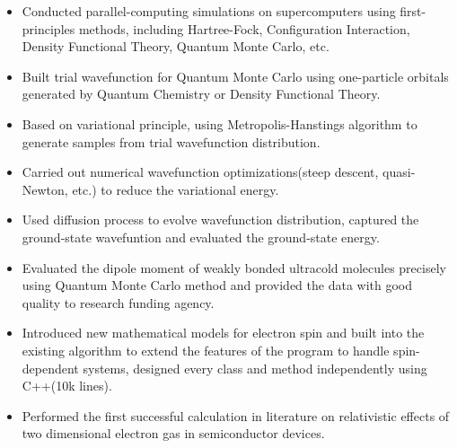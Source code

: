 \documentclass[11pt]{article} %
\begin{document}
\begin{itemize}
\item Conducted parallel-computing simulations on supercomputers using first-principles methods, including Hartree-Fock, Configuration Interaction, Density Functional Theory, Quantum Monte Carlo, etc.\\
\vspace{-4mm}
\item Built trial wavefunction for Quantum Monte Carlo using one-particle orbitals generated by Quantum Chemistry or Density Functional Theory.\\
\vspace{-4mm}
\item Based on variational principle, using Metropolis-Hanstings algorithm to generate samples from trial wavefunction distribution.\\
\vspace{-4mm}
 \item Carried out numerical wavefunction optimizations(steep descent, quasi-Newton, etc.) to reduce the variational energy. \\
 \vspace{-4mm}
\item Used diffusion process to evolve wavefunction distribution, captured the ground-state wavefuntion and evaluated the ground-state energy.\\
\vspace{-4mm}
\item Evaluated the dipole moment of weakly bonded ultracold molecules precisely using Quantum Monte Carlo method and provided the data with good quality to research funding agency.\\
\vspace{-4mm}
\item Introduced new mathematical models for electron spin and built into the existing algorithm to extend the features of the program to handle spin-dependent systems, designed every class and method independently using C++(10k lines). \\
\vspace{-4mm}
  \item Performed the first successful calculation in literature on relativistic effects of two dimensional electron gas in semiconductor devices.\\
\end{itemize}
\end{document}
